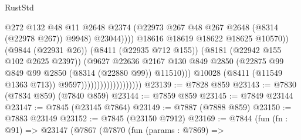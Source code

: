 \begin{lexlean}{RustStd}
\begin{coremodule}
                                                        @272
                                                        @132
                                                        @48
                                                        @11
                                                        @2648
                                                        @2374
                                                        (@22973
                                                          @267
                                                          @48
                                                          @267
                                                          @2648
                                                          (@8314 (@22978 @267))
                                                          @9948)
                                                        @23044))))
                                                @18616
                                                @18619
                                                @18622
                                                @18625
                                                @10570))
                                            (@9844 (@22931 @26))
                                            (@8411 (@22935 @712 @155))
                                            (@8181 (@22942 @155 @102 @2625 @2397))
                                            (@9627
                                              @22636
                                              @2167
                                              @130
                                              @849
                                              @2850
                                              (@22875
                                                @99
                                                @849
                                                @99
                                                @2850
                                                (@8314 (@22880 @99))
                                                @11510)))
                                          @10028
                                          (@8411 (@11549 @1363 @713))
                                          @9597)))))))))))))))))))
@23139 := @7828 @859
@23143 := @7830 (@7834 @859) (@7840 @859)
@23144 := @7859 @859
@23145 := @7849 @23144
@23147 := @7845 (@23145 @7864)
@23149 := @7887 (@7888 @859)
@23150 := @7883 @23149
@23152 := @7845 (@23150 @7912)
@23169 := @7844
    (fun (fn : @91) =>
    @23147
      (@7867
        (@7870
          (fun (params : @7869) =>

\end{coremodule}
\end{lexlean}
